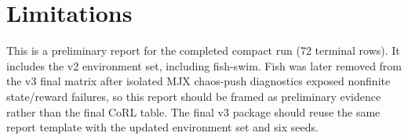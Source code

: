\documentclass[10pt]{article}
\begin{document}
\section*{Limitations}
This is a preliminary report for the completed compact run (72 terminal rows). It includes the v2 environment set, including fish-swim. Fish was later removed from the v3 final matrix after isolated MJX chaos-push diagnostics exposed nonfinite state/reward failures, so this report should be framed as preliminary evidence rather than the final CoRL table. The final v3 package should reuse the same report template with the updated environment set and six seeds.
\end{document}
